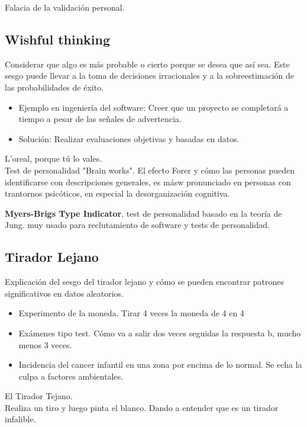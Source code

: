 \documentclass[12pt, a4paper, twoside]{article}
\begin{document}
Falacia de la validación personal.

\subsection{Wishful thinking}
Considerar que algo es más probable o cierto porque se desea que así sea. Este sesgo puede llevar a la toma de decisiones irracionales y a la sobreestimación de las probabilidades de éxito.

\begin{itemize}
    \item{Ejemplo en ingeniería del software: Creer que un proyecto se completará a tiempo a pesar de las señales de advertencia.}
    \item{Solución: Realizar evaluaciones objetivas y basadas en datos.}
\end{itemize}

L'oreal, porque tú lo vales.\\

Test de personalidad "Brain works". El efecto Forer y cómo las personas pueden identificarse con descripciones generales, es másw pronunciado en 
personas con trantornos psicóticos, en especial la desorganización cognitiva.

\textbf{Myers-Brigs Type Indicator}, test de personalidad basado en la teoría de Jung. muy usado para
reclutamiento de software y tests de personalidad.\\

\subsection{Tirador Lejano}
Explicación del sesgo del tirador lejano y cómo se pueden encontrar patrones significativos en datos aleatorios.
\begin{itemize}
    \item Experimento de la moneda. Tirar 4 veces la moneda de 4 en 4 
    \item Exámenes tipo test. Cómo va a salir dos veces seguidas la respuesta b, mucho menos 3 veces.
    \item Incidencia del cancer infantil en una zona por encima de lo normal. Se echa la culpa a factores ambientales.
\end{itemize}

El Tirador Tejano.\\

Realiza un tiro y luego pinta el blanco. Dando a entender que es un tirador infalible.
\end{document}
